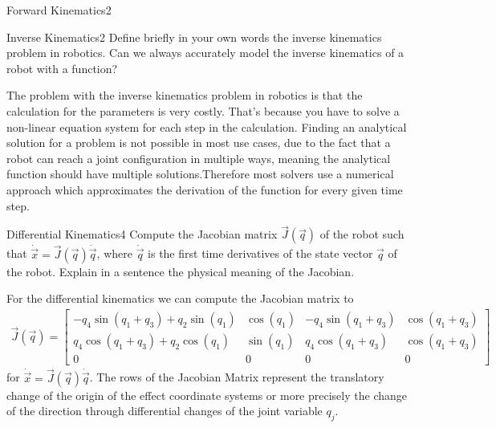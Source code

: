 \begin{questions}
\begin{question}{Forward Kinematics}{2}
\begin{answer}
\end{answer}
\end{question}


\begin{question}{Inverse Kinematics}{2}
Define briefly in your own words the inverse kinematics problem in robotics. Can we always accurately model the inverse kinematics of a robot with a function?

\begin{answer}
The problem with the inverse kinematics problem in robotics is that the calculation for the parameters is very costly. That's because you have to solve a non-linear equation system for each step in the calculation. Finding an analytical solution for a problem is not possible in most use cases, due to the fact that a robot can reach a joint configuration in multiple ways, meaning the analytical function should have multiple solutions.Therefore most solvers use a numerical approach which approximates the derivation of the function for every given time step.

\end{answer}
\end{question}


\begin{question}{Differential Kinematics}{4}
Compute the Jacobian matrix $\vec{J}(\vec{q})$ of the robot such that $\dot{\vec{x}}=\vec{J}(\vec{q})\dot{\vec{q}}$, where $\dot{\vec{q}}$ is the first time derivatives of the state vector $\vec{q}$ of the robot. Explain in a sentence the physical meaning of the Jacobian. 

\begin{answer}
For the differential kinematics we can compute the Jacobian matrix to
\begin{align*}
\vec{J}(\vec{q}) = 
\begin{bmatrix}
-q_{\textrm{4}}\sin(q_{\textrm{1}}+q_{\textrm{3}}) + q_{\textrm{2}}\sin(q_{\textrm{1}}) &
\cos(q_{\textrm{1}}) &
-q_{\textrm{4}}\sin(q_{\textrm{1}}+q_{\textrm{3}})&
\cos(q_{\textrm{1}}+q_{\textrm{3}})\\
q_{\textrm{4}}\cos(q_{\textrm{1}}+q_{\textrm{3}}) + q_{\textrm{2}}\cos(q_{\textrm{1}})&
\sin(q_{\textrm{1}})&
q_{\textrm{4}}\cos(q_{\textrm{1}}+q_{\textrm{3}})&
\cos(q_{\textrm{1}}+q_{\textrm{3}})\\
0 & 0 & 0 & 0 
\end{bmatrix}
\end{align*}
for $\dot{\vec{x}}=\vec{J}(\vec{q})\dot{\vec{q}}$.
The rows of the Jacobian Matrix represent the translatory change of the origin of the effect coordinate systems or more precisely the change of the direction through differential changes of the joint variable $q_j$.


\end{answer}
\end{question}
\end{questions}
